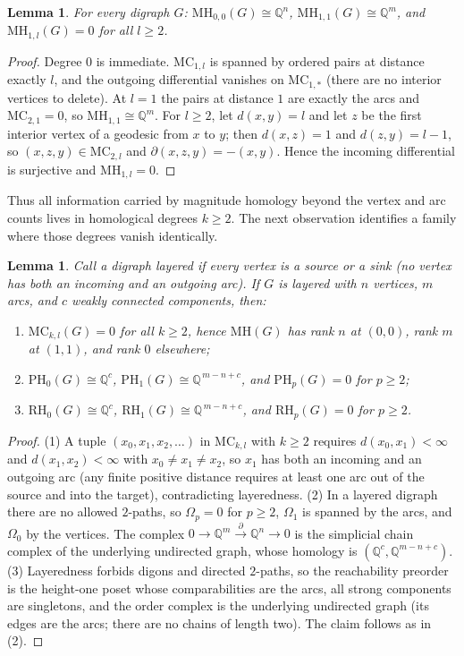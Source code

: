 \documentclass[pdflatex,sn-mathphys,Numbered]{sn-jnl}
\theoremstyle{thmstyleone}
\newtheorem{lemma}[theorem]{Lemma}
\theoremstyle{thmstyletwo}
\newcommand{\MH}{\mathrm{MH}}
\newcommand{\PH}{\mathrm{PH}}
\newcommand{\RH}{\mathrm{RH}}
\newcommand{\MC}{\mathrm{MC}}
\newcommand{\QQ}{\mathbb{Q}}
\begin{document}
\begin{lemma}\label{lem:mh1}
For every digraph $G$: $\MH_{0,0}(G) \cong \QQ^{n}$,
$\MH_{1,1}(G) \cong \QQ^{m}$, and $\MH_{1,l}(G) = 0$ for all $l \ge 2$.
\end{lemma}

\begin{proof}
Degree $0$ is immediate. $\MC_{1,l}$ is spanned by ordered pairs at
distance exactly $l$, and the outgoing differential vanishes on
$\MC_{1,\ast}$ (there are no interior vertices to delete). At $l = 1$
the pairs at distance $1$ are exactly the arcs and $\MC_{2,1} = 0$, so
$\MH_{1,1} \cong \QQ^m$. For $l \ge 2$, let $d(x,y) = l$ and let $z$ be
the first interior vertex of a geodesic from $x$ to $y$; then
$d(x,z) = 1$ and $d(z,y) = l - 1$, so $(x,z,y) \in \MC_{2,l}$ and
$\partial(x,z,y) = -(x,y)$. Hence the incoming differential is
surjective and $\MH_{1,l} = 0$.
\end{proof}

Thus all information carried by magnitude homology beyond the vertex and
arc counts lives in homological degrees $k \ge 2$. The next observation
identifies a family where those degrees vanish identically.

\begin{lemma}\label{lem:sourcesink}
Call a digraph \emph{layered} if every vertex is a source or a sink
(no vertex has both an incoming and an outgoing arc). If $G$ is layered
with $n$ vertices, $m$ arcs, and $c$ weakly connected components, then:
\begin{enumerate}
\item $\MC_{k,l}(G) = 0$ for all $k \ge 2$, hence $\MH(G)$ has rank $n$
at $(0,0)$, rank $m$ at $(1,1)$, and rank $0$ elsewhere;
\item $\PH_0(G) \cong \QQ^{c}$, $\PH_1(G) \cong \QQ^{\,m - n + c}$, and
$\PH_p(G) = 0$ for $p \ge 2$;
\item $\RH_0(G) \cong \QQ^{c}$, $\RH_1(G) \cong \QQ^{\,m - n + c}$, and
$\RH_p(G) = 0$ for $p \ge 2$.
\end{enumerate}
\end{lemma}

\begin{proof}
(1) A tuple $(x_0, x_1, x_2, \dots)$ in $\MC_{k,l}$ with $k \ge 2$
requires $d(x_0, x_1) < \infty$ and $d(x_1, x_2) < \infty$ with
$x_0 \ne x_1 \ne x_2$, so $x_1$ has both an incoming and an outgoing arc
(any finite positive distance requires at least one arc out of the source
and into the target), contradicting layeredness.
(2) In a layered digraph there are no allowed $2$-paths, so
$\Omega_p = 0$ for $p \ge 2$, $\Omega_1$ is spanned by the arcs, and
$\Omega_0$ by the vertices. The complex
$0 \to \QQ^m \xrightarrow{\;\partial\;} \QQ^n \to 0$ is the simplicial
chain complex of the underlying undirected graph, whose homology is
$(\QQ^c, \QQ^{m-n+c})$.
(3) Layeredness forbids digons and directed $2$-paths, so the
reachability preorder is the height-one poset whose comparabilities are
the arcs, all strong components are singletons, and the order complex is
the underlying undirected graph (its edges are the arcs; there are no
chains of length two). The claim follows as in (2).
\end{proof}
\end{document}
